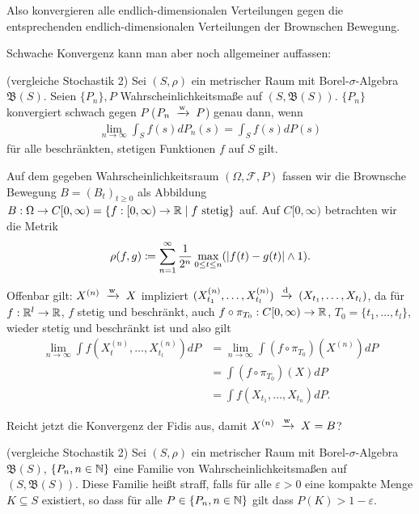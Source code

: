 \documentclass[a4paper,twoside,DIV15,BCOR12mm]{scrbook}
\newcommand{\cF}{\mathcal F}
\newcommand{\borel}{{\mathfrak B}}
\begin{document}
Also konvergieren alle endlich-dimensionalen Verteilungen gegen die entsprechenden endlich-dimensionalen Verteilungen der Brownschen Bewegung.

Schwache Konvergenz kann man aber noch allgemeiner auffassen:

\begin{definition}
(vergleiche Stochastik 2) Sei $(S,\rho)$ ein metrischer Raum mit Borel-$\sigma$-Algebra $\borel(S)$. Seien $\{P_n\}, P$ Wahrscheinlichkeitsmaße auf $(S,\borel(S))$. $\{P_n\}$ konvergiert schwach gegen $P$  ($P_n\tonach w P$) genau dann, wenn
\begin{align*}
\lim_{n\to\infty} \int_S f(s) dP_n(s) = \int_S f(s) dP(s)
\end{align*}
für alle beschränkten, stetigen Funktionen $f$ auf $S$ gilt.
\end{definition}

Auf dem gegeben Wahrscheinlichkeitsraum $(\Omega,\cF, P)$ fassen wir die Brownsche Bewegung $B=(B_t)_{t\ge 0}$ als Abbildung $B:\Omega \to C[0,\infty) = \{f: [0,\infty) \to \mathbb{R} \mid f \text{ stetig}\}$ auf. Auf $C[0,\infty)$ betrachten wir die Metrik
\begin{align*}
\rho(f,g) \da \sum_{n=1}^\infty \frac{1}{2^n} \max_{0\le t\le n}( | f(t)-g(t)| \wedge 1).
\end{align*}

Offenbar gilt: $X^{(n)} \tonach w X$ impliziert $(X_{t_1}^{(n)},\ldots,X_{t_l}^{(n)})\tonach d (X_{t_1},\ldots,X_{t_l})$, da für $f:\mathbb{R}^l\to \mathbb{R}$, $f$ stetig und beschränkt, auch $f\circ \pi_{T_0}: C[0,\infty) \to \mathbb{R}$, $T_0=\{t_1,\ldots,t_l\}$, wieder stetig und beschränkt ist und also gilt
\begin{align*}
\lim_{n\to\infty} \int f(X_t^{(n)},\ldots,X_{t_l}^{(n)}) dP 
&=\lim_{n\to\infty} \int (f\circ \pi_{T_0}) (X^{(n)}) dP\\
&= \int(f\circ \pi_{T_0})(X)dP \\
&= \int f(X_{t_1},\ldots,X_{t_n})dP.
\end{align*}

Reicht jetzt die Konvergenz der Fidis aus, damit $X^{(n)} \tonach w X=B$?

\begin{definition}
(vergleiche Stochastik 2) Sei $(S,\rho)$ ein metrischer Raum mit Borel-$\sigma$-Algebra $\borel(S)$, $\{P_n, n\in\mathbb{N}\}$ eine Familie von Wahrscheinlichkeitsmaßen auf $(S,\borel(S))$. Diese Familie heißt straff, falls für alle $\varepsilon >0$ eine kompakte Menge $K\subseteq S$ existiert, so dass für alle $P\in \{P_n,n\in\mathbb{N}\}$ gilt dass $P(K) > 1-\varepsilon$.
\end{definition}
\end{document}
